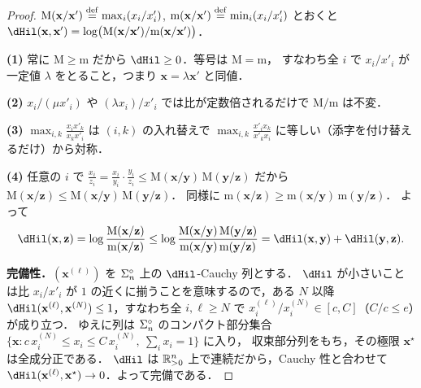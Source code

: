 \begin{proof}
  $\mathrm{M}(\mathbf{x}/\mathbf{x}') \overset{\mathrm{def}}{=} \max_i (x_i/x'_i)$,
  $\mathrm{m}(\mathbf{x}/\mathbf{x}') \overset{\mathrm{def}}{=} \min_i (x_i/x'_i)$ とおくと
  $\dHil(\mathbf{x}, \mathbf{x}') = \log\bigl(\mathrm{M}(\mathbf{x}/\mathbf{x}') / \mathrm{m}(\mathbf{x}/\mathbf{x}')\bigr)$．

  \textbf{(1)} 常に $\mathrm{M} \geq \mathrm{m}$ だから $\dHil \geq 0$．等号は $\mathrm{M} = \mathrm{m}$，
  すなわち全 $i$ で $x_i/x'_i$ が一定値 $\lambda$ をとること，つまり $\mathbf{x} = \lambda\mathbf{x}'$ と同値．

  \textbf{(2)} $x_i/(\mu x'_i)$ や $(\lambda x_i)/x'_i$ では比が定数倍されるだけで
  $\mathrm{M}/\mathrm{m}$ は不変．

  \textbf{(3)} $\max_{i,k}\frac{x_i x'_k}{x_k x'_i}$ は $(i,k)$ の入れ替えで
  $\max_{i,k}\frac{x'_i x_k}{x'_k x_i}$ に等しい（添字を付け替えるだけ）から対称．

  \textbf{(4)} 任意の $i$ で $\frac{x_i}{z_i} = \frac{x_i}{y_i}\cdot\frac{y_i}{z_i}
  \leq \mathrm{M}(\mathbf{x}/\mathbf{y})\,\mathrm{M}(\mathbf{y}/\mathbf{z})$ だから
  $\mathrm{M}(\mathbf{x}/\mathbf{z}) \leq \mathrm{M}(\mathbf{x}/\mathbf{y})\,\mathrm{M}(\mathbf{y}/\mathbf{z})$．
  同様に $\mathrm{m}(\mathbf{x}/\mathbf{z}) \geq \mathrm{m}(\mathbf{x}/\mathbf{y})\,\mathrm{m}(\mathbf{y}/\mathbf{z})$．
  よって
  \[
    \dHil(\mathbf{x}, \mathbf{z})
    = \log\frac{\mathrm{M}(\mathbf{x}/\mathbf{z})}{\mathrm{m}(\mathbf{x}/\mathbf{z})}
    \leq \log\frac{\mathrm{M}(\mathbf{x}/\mathbf{y})\,\mathrm{M}(\mathbf{y}/\mathbf{z})}
                  {\mathrm{m}(\mathbf{x}/\mathbf{y})\,\mathrm{m}(\mathbf{y}/\mathbf{z})}
    = \dHil(\mathbf{x}, \mathbf{y}) + \dHil(\mathbf{y}, \mathbf{z}).
  \]

  \textbf{完備性．}$(\mathbf{x}^{(\ell)})$ を $\Sigma_n^\circ$ 上の $\dHil$-Cauchy 列とする．
  $\dHil$ が小さいことは比 $x_i/x'_i$ が $1$ の近くに揃うことを意味するので，ある $N$ 以降
  $\dHil(\mathbf{x}^{(\ell)}, \mathbf{x}^{(N)}) \leq 1$，すなわち全 $i, \ell\geq N$ で
  $x_i^{(\ell)} / x_i^{(N)} \in [c, C]$（$C/c \leq e$）が成り立つ．
  ゆえに列は $\Sigma_n^\circ$ のコンパクト部分集合
  $\{\mathbf{x} : c\,x_i^{(N)} \leq x_i \leq C\,x_i^{(N)},\ \sum_i x_i = 1\}$ に入り，
  収束部分列をもち，その極限 $\mathbf{x}^\star$ は全成分正である．
  $\dHil$ は $\mathbb{R}_{>0}^n$ 上で連続だから，Cauchy 性と合わせて
  $\dHil(\mathbf{x}^{(\ell)}, \mathbf{x}^\star) \to 0$．よって完備である．
\end{proof}

